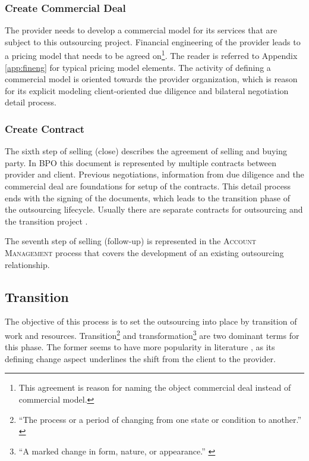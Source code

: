 	\subsubsection{Create Commercial Deal}
	
	The provider needs to develop a commercial model for its services that are subject to this outsourcing project. Financial engineering of the provider leads to a pricing model that needs to be agreed on\footnote{This agreement is reason for naming the object commercial deal instead of commercial model.}. The reader is referred to Appendix \ref{app:fineng} for typical pricing model elements. The activity of defining a commercial model is oriented towards the provider organization, which is reason for its explicit modeling \wrt client-oriented due diligence and bilateral negotiation detail process. 
	
	\subsubsection{Create Contract}
	
	The sixth step of selling (close) describes the agreement of selling and buying party. In \acrshort{BPO} this document is represented by multiple contracts between provider and client. Previous negotiations, information from due diligence and the commercial deal are foundations for setup of the contracts. This detail process ends with the signing of the documents, which leads to the transition phase of the outsourcing lifecycle. Usually there are separate contracts for outsourcing and the transition project \citep{bitkom2008}. 
	
	The seventh step of selling (follow-up) is represented in the \textsc{Account Management} process that covers the development of an existing outsourcing relationship. 
	
	
	\subsection{Transition}
	The objective of this process is to set the outsourcing into place by transition of work and resources. Transition\footnote{\enquote{The process or a period of changing from one state or condition to another.} \citep{oxfordtransition}} and transformation\footnote{\enquote{A marked change in form, nature, or appearance.} \citep{oxfordtransformation}} are two dominant terms for this phase. The former seems to have more popularity in literature \citep{perunovic2007outsourcing}, as its defining change aspect underlines the shift from the client to the provider. 
	
